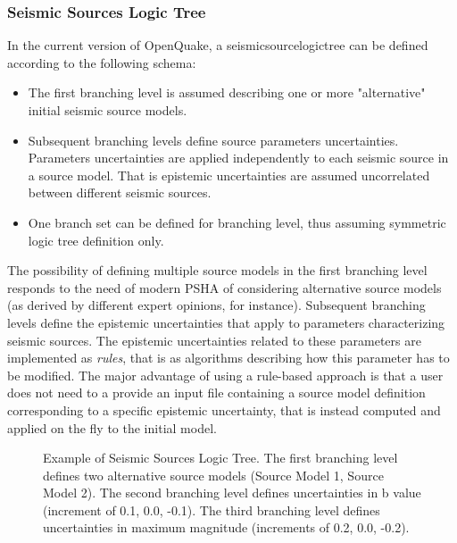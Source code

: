 \subsubsection{Seismic Sources Logic Tree}
\label{hazard:source_model_logic_tree}
%
In the current version of OpenQuake, a \gls{seismicsourcelogictree} can be 
defined according to the following schema:
\begin{itemize}
\item The first branching level is assumed describing one or more "alternative" 
initial seismic source models.
\item Subsequent branching levels define source parameters uncertainties. 
Parameters uncertainties are applied independently to each seismic source 
in a source model. That is epistemic uncertainties are assumed uncorrelated 
between different seismic sources.
\item One branch set can be defined for branching level, thus assuming 
symmetric logic tree definition only.
\end{itemize}
%
The possibility of defining multiple source models in the first branching 
level responds to the need of modern PSHA of considering alternative source 
models (as derived by different expert opinions, for instance). 
%
Subsequent branching levels define the epistemic uncertainties that 
apply to parameters characterizing seismic sources. The  
epistemic uncertainties related to these parameters are implemented as 
\emph{rules}, that is as algorithms describing how this parameter has to be 
modified. 
%
The major advantage of using a rule-based approach is that a user does not 
need to a provide an input file containing a source model definition 
corresponding to a specific epistemic uncertainty, that is instead computed 
and applied on the fly to the initial model.
%
\begin{figure}

\caption{Example of Seismic Sources Logic Tree. The first branching level defines
two alternative source models (Source Model 1, Source Model 2). The second 
branching level defines uncertainties in b value (increment of 0.1, 0.0, -0.1).
The third branching level defines uncertainties in maximum magnitude 
(increments of 0.2, 0.0, -0.2).}
\label{fig:SourceModelLogicTree}
\end{figure}
%

